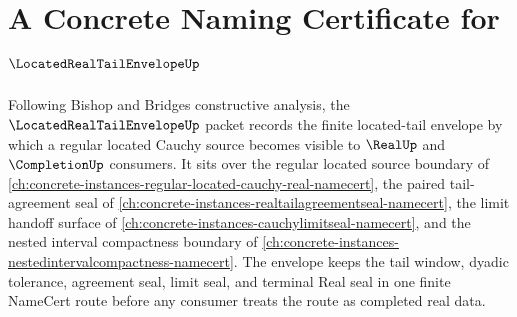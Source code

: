 \chapter{A Concrete Naming Certificate for $\LocatedRealTailEnvelopeUp$}
\label{ch:concrete-instances-located-real-tail-envelope-namecert}

Following Bishop and Bridges constructive analysis, the $\LocatedRealTailEnvelopeUp$ packet records the finite located-tail envelope by which a regular located Cauchy source becomes visible to $\RealUp$ and $\CompletionUp$ consumers. It sits over the regular located source boundary of \autoref{ch:concrete-instances-regular-located-cauchy-real-namecert}, the paired tail-agreement seal of \autoref{ch:concrete-instances-realtailagreementseal-namecert}, the limit handoff surface of \autoref{ch:concrete-instances-cauchylimitseal-namecert}, and the nested interval compactness boundary of \autoref{ch:concrete-instances-nestedintervalcompactness-namecert}. The envelope keeps the tail window, dyadic tolerance, agreement seal, limit seal, and terminal Real seal in one finite NameCert route before any consumer treats the route as completed real data.

